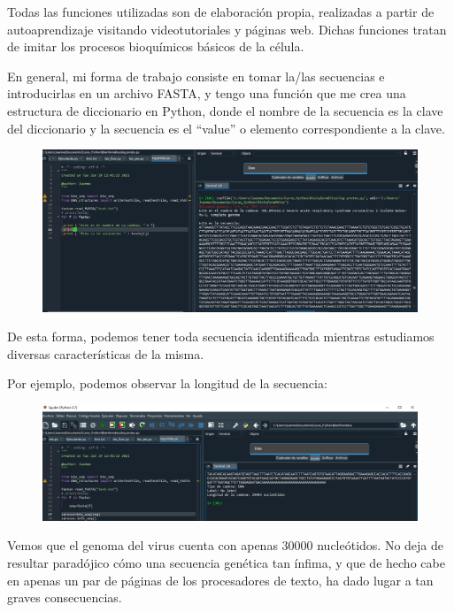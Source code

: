 \documentclass[12pt]{article}
\begin{document}
Todas las funciones utilizadas son de elaboración propia, realizadas a partir de autoaprendizaje visitando videotutoriales y páginas web. Dichas funciones tratan de imitar los procesos bioquímicos básicos de la célula.
\newline

En general, mi forma de trabajo consiste en tomar la/las secuencias e introducirlas en un archivo FASTA, y tengo una función que me crea una estructura de diccionario en Python, donde el nombre de la secuencia es la clave del diccionario y la secuencia es el “value” o elemento correspondiente a la clave.
\begin{figure}[H]
\raggedright
\includegraphics[trim={0 0 0 1.2cm},clip,scale=0.4]{Screenshot_2}
\end{figure}
De esta forma, podemos tener toda secuencia identificada mientras estudiamos diversas características de la misma.
\newline

Por ejemplo, podemos observar la longitud de la secuencia:
\newline
\begin{figure}[H]
\raggedright
\includegraphics[trim={0 0 0 3cm},clip,scale=0.45]{Screenshot_3}
\end{figure}
Vemos que el genoma del virus cuenta con apenas 30000 nucleótidos. No deja de resultar paradójico cómo una secuencia genética tan ínfima, y que de hecho cabe en apenas un par de páginas de los procesadores de texto, ha dado lugar a tan graves consecuencias.
\newline
\end{document}
